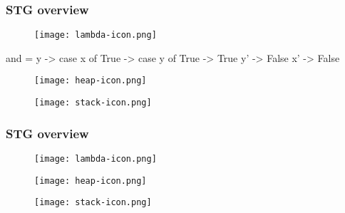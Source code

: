 \documentclass[bigger]{beamer}
\begin{document}
\begin{frame}[fragile]
\frametitle{STG overview}
\begin{center}

	\begin{minipage}{0.30\textwidth}
		\vspace{1.8cm}
		\begin{figure}
			\texttt{[image: lambda-icon.png]}
		\end{figure}
		\begin{haskellcode}
			and = \x y -> case x of
			  True -> case y of
			    True -> True
			    y' -> False
			  x' -> False
		\end{haskellcode}
	\end{minipage}
	\hfill
	\begin{minipage}{0.30\textwidth}
		\begin{figure}
			\texttt{[image: heap-icon.png]}
		\end{figure}
	\end{minipage}
	\hfill
	\begin{minipage}{0.30\textwidth}
		\begin{figure}
			\texttt{[image: stack-icon.png]}
		\end{figure}
	\end{minipage}

\end{center}
\end{frame}

\begin{frame}[fragile]
\frametitle{STG overview}
\begin{center}

	\begin{minipage}{0.25\textwidth}
		\begin{figure}
			\texttt{[image: lambda-icon.png]}
		\end{figure}
	\end{minipage}
	\hfill
	\begin{minipage}{0.30\textwidth}
		\begin{figure}
			\texttt{[image: heap-icon.png]}
		\end{figure}
	\end{minipage}
	\hfill
	\begin{minipage}{0.30\textwidth}
		\begin{figure}
			\texttt{[image: stack-icon.png]}
		\end{figure}
	\end{minipage}

\end{center}
\end{frame}
\end{document}

